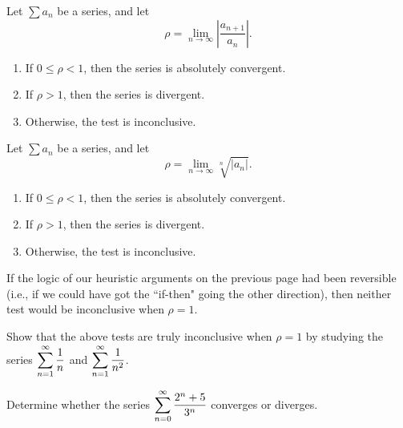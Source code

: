 \newpage

\begin{theorem}
Let $\sum a_n$ be a series, and let
\begin{equation*}
\rho=\lim_{n\to\infty}\left|\frac{a_{n+1}}{a_n}\right|.
\end{equation*}
\begin{enumerate}
\item If $0\le \rho< 1$, then the series is absolutely convergent.
\item If $\rho>1$, then the series is divergent.
\item Otherwise, the test is inconclusive.
\end{enumerate}
\end{theorem}

\begin{theorem}
Let $\sum a_n$ be a series, and let
\begin{equation*}
\rho=\lim_{n\to\infty}\sqrt[n]{|a_n|}.
\end{equation*}
\begin{enumerate}
\item If $0\le \rho< 1$, then the series is absolutely convergent.
\item If $\rho>1$, then the series is divergent.
\item Otherwise, the test is inconclusive.
\end{enumerate}
\end{theorem}

\begin{remark}
If the logic of our heuristic arguments on the previous page had been reversible (i.e., if we could have got the ``if-then" going the other direction), then neither test would be inconclusive when $\rho=1$.
\end{remark}

\newpage

\begin{example}
Show that the above tests are truly inconclusive when $\rho=1$ by studying the series $\displaystyle\sum_{n=1}^\infty\frac{1}{n}$ and $\displaystyle\sum_{n=1}^\infty\frac{1}{n^2}$.
\end{example}

\newpage

\begin{example}
Determine whether the series $\displaystyle\sum_{n=0}^\infty\frac{2^n+5}{3^n}$ converges or diverges.
\end{example}

\newpage

